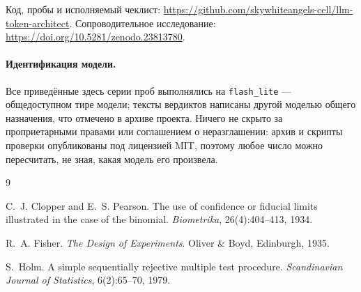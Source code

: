 \documentclass[11pt]{article}
\begin{document}
Код, пробы и исполняемый чеклист:
\url{https://github.com/skywhiteangels-cell/llm-token-architect}.
Сопроводительное исследование: \url{https://doi.org/10.5281/zenodo.23813780}.

\paragraph{Идентификация модели.} Все приведённые здесь серии проб выполнялись
на \texttt{flash\_lite} — общедоступном тире модели; тексты вердиктов написаны
другой моделью общего назначения, что отмечено в архиве проекта. Ничего не
скрыто за проприетарными правами или соглашением о неразглашении: архив и
скрипты проверки опубликованы под лицензией MIT, поэтому любое число можно
пересчитать, не зная, какая модель его произвела.

\begin{thebibliography}{9}

C.~J. Clopper and E.~S. Pearson.
\newblock The use of confidence or fiducial limits illustrated in the case of
  the binomial.
\newblock \emph{Biometrika}, 26(4):404--413, 1934.

R.~A. Fisher.
\newblock \emph{The Design of Experiments}.
\newblock Oliver \& Boyd, Edinburgh, 1935.

S.~Holm.
\newblock A simple sequentially rejective multiple test procedure.
\newblock \emph{Scandinavian Journal of Statistics}, 6(2):65--70, 1979.

\end{thebibliography}
\end{document}
